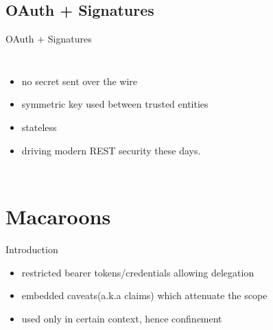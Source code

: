 \documentclass[9pt]{beamer}
\begin{document}

\subsection{OAuth + Signatures}
\begin{frame}{OAuth + Signatures}
  \begin{columns}
    \begin{itemize}
    \item no secret sent over the wire
      \pause
    \item symmetric key used between trusted entities
      \pause
    \item stateless
      \pause
    \item driving modern REST security these days.
    \end{itemize}
  \end{columns}
\end{frame}


\section{Macaroons}
\begin{frame}{Introduction}
  \begin{itemize}
    \item restricted bearer tokens/credentials allowing delegation
      \pause
    \item embedded caveats(a.k.a claims) which attenuate the scope
      \pause
    \item used only in certain context, hence confinement
  \end{itemize}
\end{frame}
\end{document}
